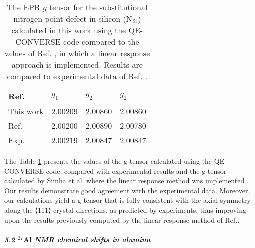 \documentclass[final,3p,times,twocolumn]{elsarticle}
\begin{document}
\begin{small}
\begin{table}[]
\setlength{\tabcolsep}{10pt}
\caption{The EPR $g$ tensor for the substitutional nitrogen 
point defect in silicon (N$_{\rm Si}$) calculated in this 
work using the {\selectfont QE-CONVERSE } code compared to the values of  Ref. \cite{nano13142123},
in which a linear response approach is implemented. Results are compared 
to experimental data of Ref. \cite{PhysRevB.89.115207}.}
\vskip0.3cm
\label{table:epr}
\begin{center}
\begin{tabular}{llll}
\hline \hline
 Ref.   & $g_{1}$ &  $g_{2}$ & $g_{2}$ \\ 
\hline
 This work & 2.00209     & 2.00860     & 2.00860     \\ 
 Ref. \cite{nano13142123}      & 2.00200     & 2.00890     & 2.00780     \\ 
 Exp. \cite{PhysRevB.89.115207}      & 2.00219     & 2.00847     & 2.00847     \\ 
 \hline \hline
\end{tabular}
\end{center}
\end{table}
\noindent
The Table \ref{table:epr} presents the values of the g tensor calculated using the {\selectfont QE-CONVERSE} code, compared with experimental results \cite{PhysRevB.89.115207} and the g tensor calculated by Simha et al.\cite{nano14010021} where the linear response method was implemented \cite{PhysRevLett.88.086403}. Our results demonstrate good agreement with the experimental data. Moreover, our calculations yield a g tensor that is fully consistent with the axial symmetry along the ⟨111⟩ crystal directions, as predicted by experiments, thus improving upon the results previously computed by the linear response method of Ref.\cite{nano14010021}.\\
\subparagraph{5.2 \(\textbf{${}^{27}$Al}\) NMR chemical shifts in alumina}\ \\ \\

\end{small}
\end{document}
